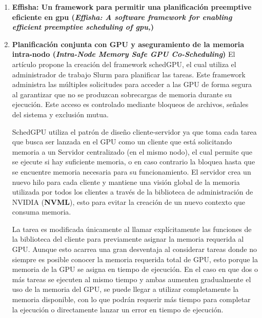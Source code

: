 \begin{enumerate}
\begin{enumerate}
\end{enumerate}
	
	
\item \textbf{Effisha: Un framework para permitir una planificación preemptive eficiente en gpu 
	(\textit{Effisha: A software framework for enabling efficient preemptive scheduling of gpu,})}
	
\item \textbf{Planificación conjunta con GPU y aseguramiento de la memoria intra-nodo 
	(\textit{Intra-Node Memory Safe GPU Co-Scheduling})}
	El artículo \cite{IntraNode} propone la creación del framework schedGPU, el cual utiliza el administrador de trabajo Slurm para planificar las tareas. Este framework administra las múltiples solicitudes para acceder a las GPU de forma segura al garantizar que no se produzcan sobrecargas de memoria durante su ejecución. Este acceso es controlado mediante bloqueos de archivos, señales del sistema y exclusión mutua.

SchedGPU utiliza el patrón de diseño cliente-servidor ya que toma cada tarea que busca ser lanzada en el GPU como un cliente que está solicitando memoria a un Servidor centralizado (en el mismo nodo), el cual permite que se ejecute si hay suficiente memoria, o en caso contrario la bloquea hasta que se encuentre memoria necesaria para su funcionamiento. El servidor crea un nuevo hilo para cada cliente y mantiene una visión global de la memoria utilizada por todos los clientes a través de la biblioteca de administración de NVIDIA (\textbf{NVML}), esto para evitar la creación de un nuevo contexto que consuma memoria.

\vspace{0.3cm}

La tarea es modificada únicamente al llamar explícitamente las funciones de la biblioteca del cliente para previamente asignar la memoria requerida al GPU. Aunque esto acarrea una gran desventaja al considerar tareas donde no siempre es posible conocer la memoria requerida total de GPU, esto porque la memoria de la GPU se asigna en tiempo de ejecución. En el caso en que dos o más tareas se ejecuten al mismo tiempo y ambas aumenten gradualmente el uso de la memoria del GPU, se puede llegar a utilizar completamente la memoria disponible, con lo que podrán requerir más tiempo para completar la ejecución o directamente lanzar un error en tiempo de ejecución.
	
	

\end{enumerate}
